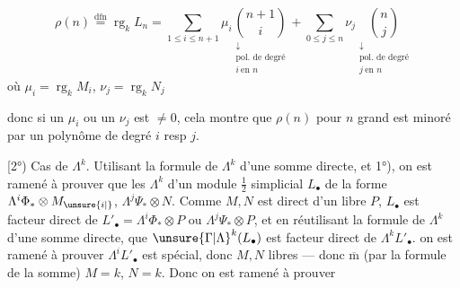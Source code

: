 \[
\rho(n)\overset{\mathrm{dfn}}{=}\operatorname{rg}_k L_n
=\sum_{1\leq i\leq n+1}\mu_i
\underset{\substack{\downarrow\\\text{pol. de degré}\\i\ \text{en }n}}{\binom{n+1}{i}}
+\sum_{0\leq j\leq n}\nu_j
\underset{\substack{\downarrow\\\text{pol. de degré}\\j\ \text{en }n}}{\binom n j}
\]
où $\mu_i=\operatorname{rg}_k M_i$, $\nu_j=\operatorname{rg}_k N_j$

donc si  un $\mu_i$ ou un $\nu_j$ est $\ne0$, cela montre que $\rho(n)$ pour $n$ grand est minoré par un polynôme de degré $i$ resp $j$.

[2°) Cas de $\Lambda^k$. Utilisant la formule de $\Lambda^k$ d'une somme directe, et 1°), on est ramené à prouver que les $\Lambda^k$ d'un module $\frac12$ simplicial $L_{\bullet}$ de la forme $\Lambda^i\Phi_*\otimes M_{\unsure{i|{}}}$, $\Lambda^j\Psi_*\otimes N$. Comme $M,N$ est  direct d'un libre $P$, $L_{\bullet}$ est facteur direct de $L'_{\bullet}=\Lambda^i\Phi_*\otimes P$ ou $\Lambda^j\Psi_*\otimes P$,   et en réutilisant la formule de $\Lambda^k$ d'une somme directe,  que $\unsure{\Gamma|\Lambda}^k(L_{\bullet})$ est facteur direct de $\Lambda^k L'_{\bullet}$.  on est ramené à prouver $\Lambda^i L'_{\bullet}$ est  spécial, donc  $M,N$ libres --- donc $\overline{\mathrm m}$ (par la formule de la somme) $M=k$, $N=k$. Donc on est ramené à prouver
